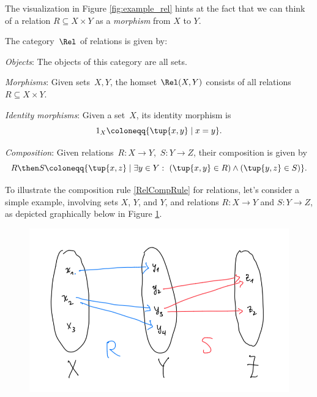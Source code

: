 The visualization in Figure \ref{fig:example_rel} hints at the fact that we can think of a relation $R \subseteq X \times Y$ as a \emph{morphism} from $X$ to $Y$.

\begin{definition} 
    The category~$\Rel$ of relations is given by:
    \begin{compactenum}
    \item \emph{Objects}: The objects of this category are all sets.
    \item \emph{Morphisms}: Given sets~$X, Y$, the homset $\Rel(X,Y)$ consists of all
    relations~$R\subseteq X\times Y$.
    \item \emph{Identity morphisms}: Given a set~$X$, its identity morphism is
  	\begin{equation}
	1_X \coloneqq \{ \tup{x,y} \mid  x = y \}.
	\end{equation}
    \item \emph{Composition}: Given relations~$R \colon X\to Y$,~$S\colon Y\to Z$, their composition is given by
    \begin{equation}\label{RelCompRule}
    R \then S \coloneqq \{\tup{x,z} \mid  \exists y \in Y : \ \left(\tup{x,y} \in R\right) \wedge \left(\tup{y,z} \in S\right)\}.
    \end{equation}
\end{compactenum}
\end{definition}


To illustrate the composition rule \ref{RelCompRule} for relations, let's consider a simple example, involving sets $X$, $Y$, and $Y$, and relations $R : X \rightarrow Y$ and $S : Y \rightarrow Z$, as depicted graphically below in Figure \ref{fig:example_rel_composable}. 
\begin{figure}[h!]
\centering
 \includegraphics[width=0.5\linewidth]{pics/dist_net_9.png}
 \caption{}
\label{fig:example_rel_composable}
\end{figure}

